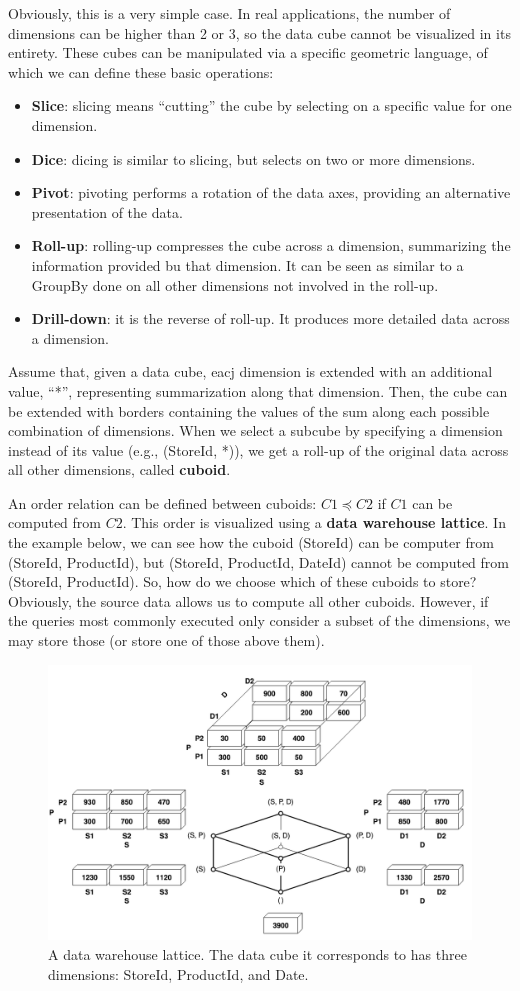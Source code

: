 Obviously, this is a very simple case. In real applications, the number of dimensions can be higher than 2 or 3, so the data cube cannot be visualized in its entirety. These cubes can be manipulated via a specific geometric language, of which we can define these basic operations:
\begin{itemize}
    \item \textbf{Slice}: slicing means ``cutting'' the cube by selecting on a specific value for one dimension.

    \item \textbf{Dice}: dicing is similar to slicing, but selects on two or more dimensions.

    \item \textbf{Pivot}: pivoting performs a rotation of the data axes, providing an alternative presentation of the data.

    \item \textbf{Roll-up}: rolling-up compresses the cube across a dimension, summarizing the information provided bu that dimension. It can be seen as similar to a GroupBy done on all other dimensions not involved in the roll-up.

    \item \textbf{Drill-down}: it is the reverse of roll-up. It produces more detailed data across a dimension.
\end{itemize}

Assume that, given a data cube, eacj dimension is extended with an additional value, ``*'', representing summarization along that dimension. Then, the cube can be extended with borders containing the values of the sum along each possible combination of dimensions. When we select a subcube by specifying a dimension instead of its value (e.g., (StoreId, *)), we get a roll-up of the original data across all other dimensions, called \textbf{cuboid}.

An order relation can be defined between cuboids: $C1 \preceq C2$ if $C1$ can be computed from $C2$. This order is visualized using a \textbf{data warehouse lattice}. In the example below, we can see how the cuboid (StoreId) can be computer from (StoreId, ProductId), but (StoreId, ProductId, DateId) cannot be computed from (StoreId, ProductId). So, how do we choose which of these cuboids to store? Obviously, the source data allows us to compute all other cuboids. However, if the queries most commonly executed only consider a subset of the dimensions, we may store those (or store one of those above them).

\begin{figure}[ht]
    \centering
    \includegraphics[width=0.8\linewidth]{img/lattice.png}
    \caption{A data warehouse lattice. The data cube it corresponds to has three dimensions: StoreId, ProductId, and Date.}
    \label{fig:lattice}
\end{figure}